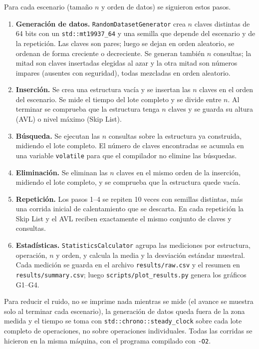 \documentclass[11pt,a4paper]{article}
\begin{document}
Para cada escenario (tamaño $n$ y orden de datos) se siguieron estos pasos.
\begin{enumerate}
  \item \textbf{Generación de datos.} \texttt{RandomDatasetGenerator} crea $n$
  claves distintas de 64 bits con un \texttt{std::mt19937\_64} y una semilla
  que depende del escenario y de la repetición. Las claves son pares; luego se
  dejan en orden aleatorio, se ordenan de forma creciente o decreciente. Se
  generan también $n$ consultas; la mitad son claves insertadas elegidas al
  azar y la otra mitad son números impares (ausentes con seguridad), todas
  mezcladas en orden aleatorio.
  \item \textbf{Inserción.} Se crea una estructura vacía y se insertan las $n$
  claves en el orden del escenario. Se mide el tiempo del lote completo y se
  divide entre $n$. Al terminar se comprueba que la estructura tenga $n$
  claves y se guarda su altura (AVL) o nivel máximo (Skip List).
  \item \textbf{Búsqueda.} Se ejecutan las $n$ consultas sobre la estructura
  ya construida, midiendo el lote completo. El número de claves encontradas
  se acumula en una variable \texttt{volatile} para que el compilador no
  elimine las búsquedas.
  \item \textbf{Eliminación.} Se eliminan las $n$ claves en el mismo orden de
  la inserción, midiendo el lote completo, y se comprueba que la estructura
  quede vacía.
  \item \textbf{Repetición.} Los pasos 1--4 se repiten 10 veces con semillas
  distintas, más una corrida inicial de calentamiento que se descarta. En
  cada repetición la Skip List y el AVL reciben exactamente el mismo conjunto
  de claves y consultas.
  \item \textbf{Estadísticas.} \texttt{StatisticsCalculator} agrupa las
  mediciones por estructura, operación, $n$ y orden, y calcula la media y la
  desviación estándar muestral. Cada medición se guarda en el archivo
  \texttt{results/raw.csv} y el resumen en \texttt{results/summary.csv};
  luego \texttt{scripts/plot\_results.py} genera los gráficos G1--G4.
\end{enumerate}

Para reducir el ruido, no se imprime nada mientras se mide (el avance se
muestra solo al terminar cada escenario), la generación de datos queda fuera
de la zona medida y el tiempo se toma con
\texttt{std::chrono::steady\_clock} sobre cada lote completo de operaciones,
no sobre operaciones individuales. Todas las corridas se hicieron en la misma
máquina, con el programa compilado con \texttt{-O2}.
\end{document}
